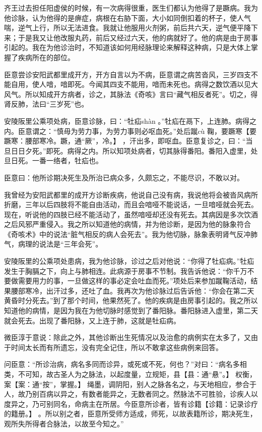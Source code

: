 \documentclass[12pt,UTF8]{ctexbook}
\begin{document}
齐王过去担任阳虚侯的时候，有一次病得很重，医生们都认为他得了是蹶病。我为他诊脉，认为他得的是痹症，病根在右胁下面，大小如同倒扣着的杯子，使人气喘，逆气上行，所以无法进食。我就让他服用火剂粥，前后共六天，逆气便平降下来；于是我又让他改服丸药，前后又经过六天，他的病就好了。他的病是由于房事引起的。我在为他诊治时，不知道该如何用经脉理论来解释这种病，只是大体上掌握了疾病所在的部位。

臣意尝诊安阳武都里成开方，开方自言以为不病，臣意谓之病苦沓风，三岁四支不能自用，使人喑，喑即死。今闻其四支不能用，喑而未死也。病得之数饮酒以见大风气。所以知成开方病者，诊之，其脉法《奇咳》言曰“藏气相反者死”。切之，得肾反肺，法曰“三岁死”也。

安陵阪里公乘项处病，臣意诊脉，曰：“牡疝shàn 。”牡疝在鬲下，上连肺。病得之内。臣意谓之：“慎毋为劳力事，为劳力事则必呕血死。”处后蹴cù 鞠，要蹶寒【要蹶寒：腰部寒冷。蹶，通“厥”，冷。】 ，汗出多，即呕血。臣意复诊之，曰：“当旦日日夕死。”即死。病得之内。所以知项处病者，切其脉得番阳。番阳入虚里，处旦日死。一番一络者，牡疝也。

臣意曰：他所诊期决死生及所治已病众多，久颇忘之，不能尽识，不敢以对。

我曾经为安阳武都里的成开方诊断疾病，他说自己没有病，我说他将会被沓风病所折磨，三年以后四肢将不能自由活动，而且会喑哑不能说话，一旦喑哑就会死去。现在，听说他的四肢已经不能活动了，虽然喑哑却还没有死去。其病因是多次饮酒之后风邪严重侵入。我之所以知道他的病情，并为他诊断，是因为他的脉象符合《奇咳术》中的说法“脏气相反的病人会死去”。我为他切脉，脉象表明肾气反冲肺气，病理的说法是“三年会死”。

安陵阪里的公乘项处患病，我为他诊脉，诊过之后对他说：“你得了牡疝病。”牡疝发生于胸膈之下，向上与肺相连。此病源于房事不节制。我告诉他说：“你千万不要做需要用力的事，一旦做这样的事必定会吐血而死。”项处后来参加蹴鞠活动，结果腰部寒冷，出汗过多，还吐了血。我再次为他诊脉过后告诉他：“你会在第二天黄昏时分死去。”到了那个时间，他果然死了。他的疾病是由房事引起的。我之所以知道他的病情，是因为我在为他切脉时感觉到了番阳脉。番阳脉进入虚里，第二天就会死去。出现了番阳脉，又上连于肺，这就是牡疝病。

微臣淳于意说：除此之外，其他诊断出生死情况以及治愈的病例实在太多了，又由于时间太长而有所遗忘，没有完全记住，所以不敢拿这些病例来回答。

问臣意：“所诊治病，病名多同而诊异，或死或不死，何也？”对曰：“病名多相类，不可知，故古圣人为之脉法，以起度量，立规矩，县【县：通“悬”。】 权衡，案【案：通“按”，掌握。】 绳墨，调阴阳，别人之脉各名之，与天地相应，参合于人，故乃别百病以异之，有数者能异之，无数者同之。然脉法不可胜验，诊疾人以度异之，乃可别同名，命病主在所居。今臣意所诊者，皆有诊籍【诊籍：记录诊疗的籍册。】 。所以别之者，臣意所受师方适成，师死，以故表籍所诊，期决死生，观所失所得者合脉法，以故至今知之。”
\end{document}
